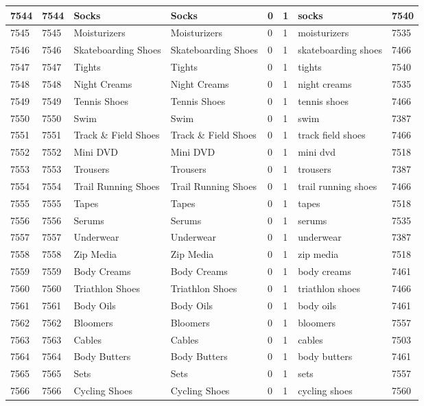 \begin{longtable}{|l|l|l|l|l|l|l|l|}
7544 & 7544 & Socks & Socks & 0 & 1 & socks & 7540 \\ \hline 
7545 & 7545 & Moisturizers & Moisturizers & 0 & 1 & moisturizers & 7535 \\ \hline 
7546 & 7546 & Skateboarding Shoes & Skateboarding Shoes & 0 & 1 & skateboarding shoes & 7466 \\ \hline 
7547 & 7547 & Tights & Tights & 0 & 1 & tights & 7540 \\ \hline 
7548 & 7548 & Night Creams & Night Creams & 0 & 1 & night creams & 7535 \\ \hline 
7549 & 7549 & Tennis Shoes & Tennis Shoes & 0 & 1 & tennis shoes & 7466 \\ \hline 
7550 & 7550 & Swim & Swim & 0 & 1 & swim & 7387 \\ \hline 
7551 & 7551 & Track \& Field Shoes & Track \& Field Shoes & 0 & 1 & track field shoes & 7466 \\ \hline 
7552 & 7552 & Mini DVD & Mini DVD & 0 & 1 & mini dvd & 7518 \\ \hline 
7553 & 7553 & Trousers & Trousers & 0 & 1 & trousers & 7387 \\ \hline 
7554 & 7554 & Trail Running Shoes & Trail Running Shoes & 0 & 1 & trail running shoes & 7466 \\ \hline 
7555 & 7555 & Tapes & Tapes & 0 & 1 & tapes & 7518 \\ \hline 
7556 & 7556 & Serums & Serums & 0 & 1 & serums & 7535 \\ \hline 
7557 & 7557 & Underwear & Underwear & 0 & 1 & underwear & 7387 \\ \hline 
7558 & 7558 & Zip Media & Zip Media & 0 & 1 & zip media & 7518 \\ \hline 
7559 & 7559 & Body Creams & Body Creams & 0 & 1 & body creams & 7461 \\ \hline 
7560 & 7560 & Triathlon Shoes & Triathlon Shoes & 0 & 1 & triathlon shoes & 7466 \\ \hline 
7561 & 7561 & Body Oils & Body Oils & 0 & 1 & body oils & 7461 \\ \hline 
7562 & 7562 & Bloomers & Bloomers & 0 & 1 & bloomers & 7557 \\ \hline 
7563 & 7563 & Cables & Cables & 0 & 1 & cables & 7503 \\ \hline 
7564 & 7564 & Body Butters & Body Butters & 0 & 1 & body butters & 7461 \\ \hline 
7565 & 7565 & Sets & Sets & 0 & 1 & sets & 7557 \\ \hline 
7566 & 7566 & Cycling Shoes & Cycling Shoes & 0 & 1 & cycling shoes & 7560 \\ \hline 

\end{longtable}
